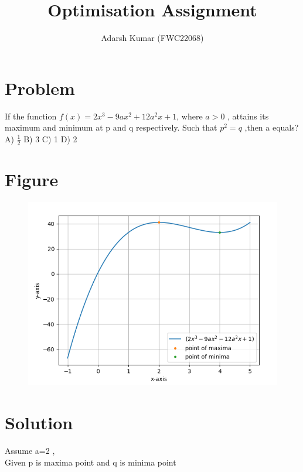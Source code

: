 \documentclass[journal,12pt,twocolumn]{IEEEtran}
\title{\mytitle}
\title
{ Optimisation Assignment 
}
\author{Adarsh Kumar (FWC22068)}
\begin{document}
\maketitle
\tableofcontents
\bigskip


\section{Problem}
If the function $ f(x) = 2x^3 -9ax^2+ 12a^2x+1 $, where $a > 0$ , attains its maximum and minimum at p and q respectively. Such that $ p^2 =q$ ,then a equals?
\linebreak
A) $\frac{1}{2}$ \hspace{2mm} B) 3\hspace{2mm}  C) 1  \hspace{2mm}D) 2\hspace{2mm}
\\
\section{Figure}
\begin{figure}[h]
    \centering
\includegraphics[width=\columnwidth]{opt.png}
    \label{fig:my_label}
\end{figure}

\section{Solution}
Assume a=2 ,\\
Given p is maxima point and q is minima point\\
\end{document}
